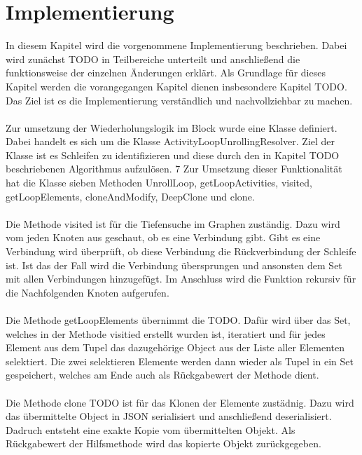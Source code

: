\documentclass{article}
\begin{document}
    \newpage
    \section{Implementierung}
    In diesem Kapitel wird die vorgenommene Implementierung beschrieben. Dabei wird zunächst TODO in Teilbereiche unterteilt und anschließend die funktionsweise der einzelnen Änderungen erklärt.
    Als Grundlage für dieses Kapitel werden die vorangegangen Kapitel dienen insbesondere Kapitel TODO.
    Das Ziel ist es die Implementierung verständlich und nachvollziehbar zu machen.\\
    \\
    Zur umsetzung der Wiederholungslogik im Block wurde eine Klasse definiert.
    Dabei handelt es sich um die Klasse ActivityLoopUnrollingResolver.
    Ziel der Klasse ist es Schleifen zu identifizieren und diese durch den in Kapitel TODO beschriebenen Algorithmus aufzulösen. 7
    Zur Umsetzung dieser Funktionalität hat die Klasse sieben Methoden UnrollLoop, getLoopActivities, visited, getLoopElements, cloneAndModify, DeepClone und clone.\\
    \\
    Die Methode visited ist für die Tiefensuche im Graphen zuständig.
    Dazu wird vom jeden Knoten aus geschaut, ob es eine Verbindung gibt.
    Gibt es eine Verbindung wird überprüft, ob diese Verbindung die Rückverbindung der Schleife ist. 
    Ist das der Fall wird die Verbindung übersprungen und ansonsten dem Set mit allen Verbindungen hinzugefügt.
    Im Anschluss wird die Funktion rekursiv für die Nachfolgenden Knoten aufgerufen.\\
    \\
    Die Methode getLoopElements übernimmt die TODO. 
    Dafür wird über das Set, welches in der Methode visitied erstellt wurden ist, iteratiert und für jedes Element aus dem Tupel das dazugehörige Object aus der Liste aller Elementen selektiert.
    Die zwei selektieren Elemente werden dann wieder als Tupel in ein Set gespeichert, welches am Ende auch als Rückgabewert der Methode dient.\\
    \\
    Die Methode clone TODO ist für das Klonen der Elemente zustädnig. Dazu wird das übermittelte Object in JSON serialisiert und anschließend deserialisiert.
    Dadruch entsteht eine exakte Kopie vom übermittelten Objekt.
    Als Rückgabewert der Hilfsmethode wird das kopierte Objekt zurückgegeben.\\
    \\
\end{document}
